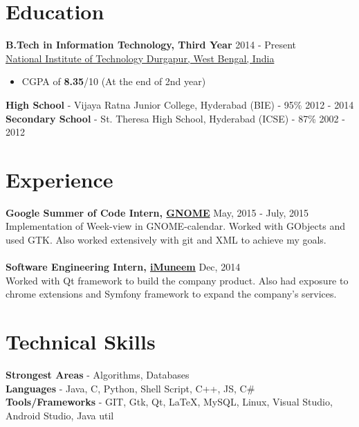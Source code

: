 \documentclass[margin, centered]{res}
\begin{document}
\begin{resume}

\section{Education}
\textbf{B.Tech in Information Technology, Third Year} \hfill 2014 - Present \\
\href{http://nitdgp.ac.in/}{National Institute of Technology Durgapur, West Bengal, India}
\begin{itemize}
 \item CGPA of \textbf{8.35}/10 (At the end of 2nd year)
\end{itemize}
\textbf{High School} - Vijaya Ratna Junior College, Hyderabad (BIE) - 95\% \hfill 2012 - 2014 \\
\textbf{Secondary School} - St. Theresa High School, Hyderabad (ICSE) - 87\% \hfill 2002 - 2012
 
\section{Experience}
\textbf{Google Summer of Code Intern, \href{https://summerofcode.withgoogle.com/archive/2016/projects/5194537727164416/}{GNOME}} \hfill May, 2015 - July, 2015\\
Implementation of Week-view in GNOME-calendar. Worked with GObjects and used GTK. Also worked extensively with git and XML to achieve my goals.   \\
\\
\textbf{Software Engineering Intern, \href{http://www.imuneem.com/}{iMuneem}} \hfill Dec, 2014 \\
Worked with Qt framework to build the company product. Also had exposure to chrome extensions and Symfony framework to expand the company's services. 

\section{Technical \hspace{2mm} Skills}
\textbf{Strongest Areas} - Algorithms, Databases\\
\textbf{Languages} - Java, C, Python, Shell Script, C++, JS, C#\\
\textbf{Tools/Frameworks} - GIT, Gtk, Qt, \LaTeX, MySQL, Linux, Visual Studio, Android Studio, Java util


\end{resume}
\end{document}
